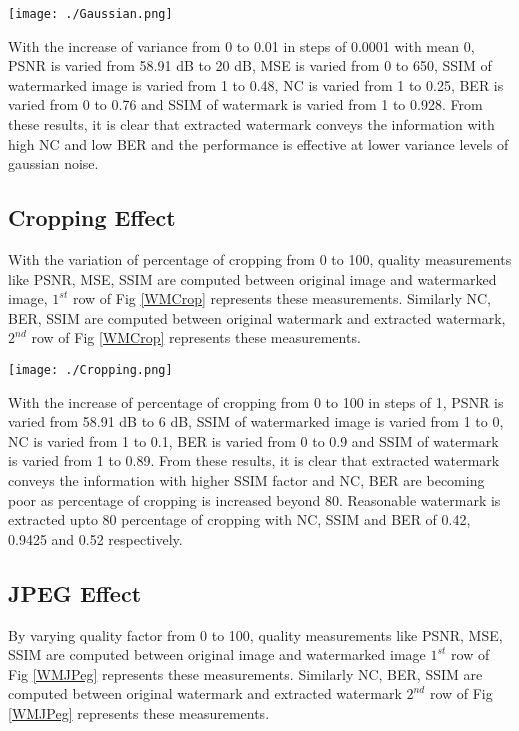 	
\begin{figure*}
\centering
\texttt{[image: ./Gaussian.png]}
\caption{Gaussian Noise}
\label{WMGaussian}
\end{figure*}

	With the increase of variance from 0 to 0.01 in steps of 0.0001 with mean 0, PSNR is varied from 58.91 dB to 20 dB, MSE is varied from 0 to 650, SSIM of watermarked image is varied from 1 to 0.48, NC is varied from 1 to 0.25, BER is varied from 0 to 0.76 and SSIM of watermark is varied from 1 to 0.928. From these results, it is clear that extracted watermark conveys the information with high NC and low BER and the performance is effective at lower variance levels of gaussian noise.

\subsection{Cropping Effect}
	With the variation of percentage of cropping from 0 to 100, quality measurements like PSNR, MSE, SSIM are computed between original image and watermarked image, $1^{st}$ row of Fig \ref{WMCrop} represents these measurements. Similarly NC, BER, SSIM are computed between original watermark and extracted watermark, $2^{nd}$ row of Fig \ref{WMCrop} represents these measurements. \\
	
\begin{figure*}
\centering
\texttt{[image: ./Cropping.png]}
\caption{Cropping Effect}
\label{WMCrop}
\end{figure*}	
	
	With the increase of percentage of cropping from 0 to 100 in steps of 1, PSNR is varied from 58.91 dB to 6 dB,  SSIM of watermarked image is varied from 1 to 0, NC is varied from 1 to 0.1, BER is varied from 0 to 0.9 and SSIM of watermark is varied from 1 to 0.89. From these results, it is clear that extracted watermark conveys the information with higher SSIM factor and NC, BER are becoming poor as percentage of cropping is increased beyond 80. Reasonable watermark is extracted upto 80 percentage of cropping with NC, SSIM and BER of 0.42, 0.9425 and 0.52 respectively. 	
	
\subsection{JPEG Effect}
By varying quality factor from 0 to 100, quality measurements like PSNR, MSE, SSIM are computed between original image and watermarked image $1^{st}$ row of Fig \ref{WMJPeg} represents these measurements. Similarly NC, BER, SSIM are computed between original watermark and extracted watermark $2^{nd}$ row of Fig \ref{WMJPeg} represents these measurements. \\

